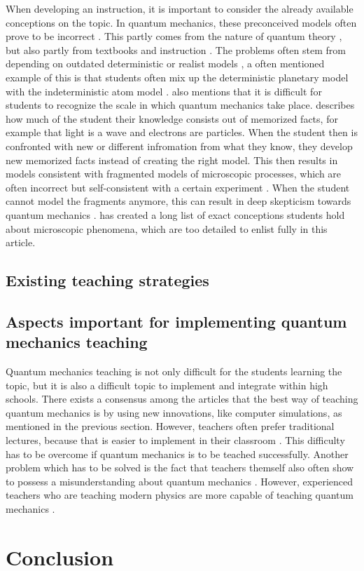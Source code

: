 \documentclass[11pt,twoside]{report} %
\begin{document}
When developing an instruction, it is important to consider the already available conceptions on the topic. In quantum mechanics, these preconceived models often prove to be incorrect \cite{thacker,papaphotis2,asikainen}. This partly comes from the nature of quantum theory \cite{papaphotis2}, but also partly from textbooks and instruction \cite{papaphotis2, hubber}. The problems often stem from depending on outdated deterministic or realist models \cite{papaphotis1,papaphotis2,hubber}, a often mentioned example of this is that students often mix up the deterministic planetary model with the indeterministic atom model \cite{dori,papaphotis1,papaphotis2,muller,henriksen,hubber}.  also mentions that it is difficult for students to recognize the scale in which quantum mechanics take place.  describes how much of the student their knowledge consists out of memorized facts, for example that light is a wave and electrons are particles. When the student then is confronted with new or different infromation from what they know, they develop new memorized facts instead of creating the right model. This then results in models consistent with fragmented models of microscopic processes, which are often incorrect but self-consistent with a certain experiment \cite{thacker,hubber}. When the student cannot model the fragments anymore, this can result in deep skepticism towards quantum mechanics \cite{levrini, henriksen, barnes}.  has created a long list of exact conceptions students hold about microscopic phenomena, which are too detailed to enlist fully in this article.

\subsection{Existing teaching strategies}

\subsection{Aspects important for implementing quantum mechanics teaching}

Quantum mechanics teaching is not only difficult for the students learning the topic, but it is also a difficult topic to implement and integrate within high schools. There exists a consensus among the articles that the best way of teaching quantum mechanics is by using new innovations, like computer simulations, as mentioned in the previous section. However, teachers often prefer traditional lectures, because that is easier to implement in their classroom \cite{adegoke}. This difficulty has to be overcome if quantum mechanics is to be teached successfully. Another problem which has to be solved is the fact that teachers themself also often show to possess a misunderstanding about quantum mechanics \cite{asikainen}. However, experienced teachers who are teaching modern physics are more capable of teaching quantum mechanics \cite{asikainen}.

\section{Conclusion}



\end{document}
